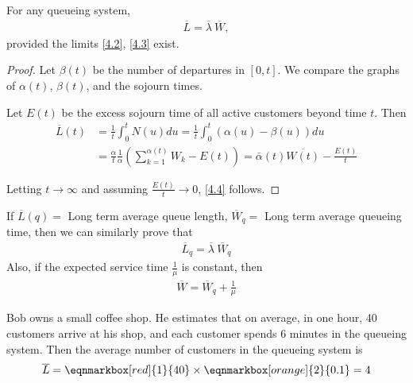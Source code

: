 \begin{theorem}
    For any queueing system, 
    \begin{align}
        \overline{L} = \overline{\lambda}                                    \ \overline{W}, \label{4.4}
    \end{align}
    provided the limits \ref{4.2}, \ref{4.3} exist.
\end{theorem}
\begin{proof}
    Let $\beta(t)$ be the number of departures in $[0,t]$. We compare the graphs of $\alpha(t)$, $\beta(t)$, and the sojourn times.


    Let $E(t)$ be the excess sojourn time of all active customers beyond time $t$. Then 
    \begin{align*}
        \overline{L}(t) &= \frac{1}{t}\int_0^t N(u)du = \frac{1}{t}\int_0^t (\alpha(u) - \beta(u)) du \\
        &= \frac{\alpha}{t} \frac{1}{\alpha} \left(\sum\limits_{k=1}^{\alpha(t)}W_k - E(t) \right) = \bar{\alpha}(t) \overline{W(t)} - \frac{E(t)}{t}
    \end{align*}

    Letting $t\to\infty$ and assuming $\frac{E(t)}{t}\to 0$, \ref{4.4} follows.
\end{proof}

\begin{remark}
    If $\overline{L}(q) = $ Long term average queue length, $\overline{W}_q = $ Long term average queueing time, then we can similarly prove that
    \begin{align*}
        \overline{L}_q = \overline{\lambda}\ \overline{W}_q
    \end{align*}
    Also, if the expected service time $\frac{1}{\mu}$ is constant, then
    \begin{align*}
        \overline{W} = \overline{W}_q + \frac{1}{\mu}
    \end{align*}
\end{remark}

\begin{example}
    Bob owns a small coffee shop. He estimates that on average, in one hour, 40 customers arrive at his shop, and each customer spends 6 minutes in the queueing system. Then the average number of customers in the queueing system is 
    \begin{align*}
        \overline{L} = \eqnmarkbox[red]{1}{40}\times \eqnmarkbox[orange]{2}{0.1} = 4
    \end{align*}
\end{example}

